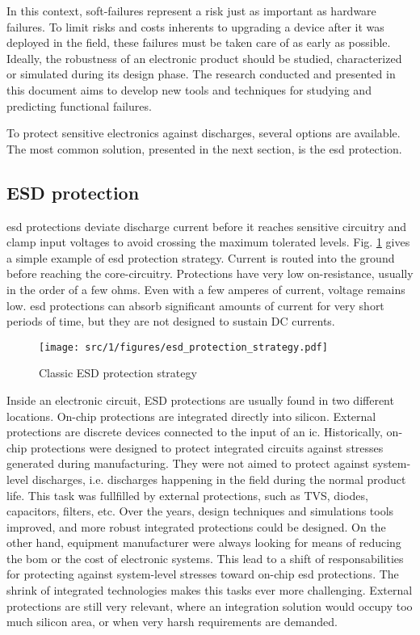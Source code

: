 In this context, soft-failures represent a risk just as important as hardware failures.
To limit risks and costs inherents to upgrading a device after it was deployed in the field, these failures must be taken care of as early as possible.
Ideally, the robustness of an electronic product should be studied, characterized or simulated during its design phase.
The research conducted and presented in this document aims to develop new tools and techniques for studying and predicting functional failures.

To protect sensitive electronics against discharges, several options are available.
The most common solution, presented in the next section, is the \gls{esd} protection.

\subsection{ESD protection}

\gls{esd} protections deviate discharge current before it reaches sensitive circuitry and clamp input voltages to avoid crossing the maximum tolerated levels.
Fig. \ref{fig:esd-protection-strategy} gives a simple example of \gls{esd} protection strategy.
Current is routed into the ground before reaching the core-circuitry.
Protections have very low on-resistance, usually in the order of a few ohms.
Even with a few amperes of current, voltage remains low.
\gls{esd} protections can absorb significant amounts of current for very short periods of time, but they are not designed to sustain DC currents.

\begin{figure}[!h]
  \centering
  \texttt{[image: src/1/figures/esd\_protection\_strategy.pdf]}
  \caption{Classic ESD protection strategy}
  \label{fig:esd-protection-strategy}
\end{figure}

Inside an electronic circuit, ESD protections are usually found in two different locations.
On-chip protections are integrated directly into silicon.
External protections are discrete devices connected to the input of an \gls{ic}.
Historically, on-chip protections were designed to protect integrated circuits against stresses generated during manufacturing.
They were not aimed to protect against system-level discharges, i.e. discharges happening in the field during the normal product life.
This task was fullfilled by external protections, such as TVS, diodes, capacitors, filters, etc.
Over the years, design techniques and simulations tools improved, and more robust integrated protections could be designed.
On the other hand, equipment manufacturer were always looking for means of reducing the \gls{bom} or the cost of electronic systems.
This lead to a shift of responsabilities for protecting against system-level stresses toward on-chip \gls{esd} protections.
The shrink of integrated technologies makes this tasks ever more challenging.
External protections are still very relevant, where an integration solution would occupy too much silicon area, or when very harsh requirements are demanded.

